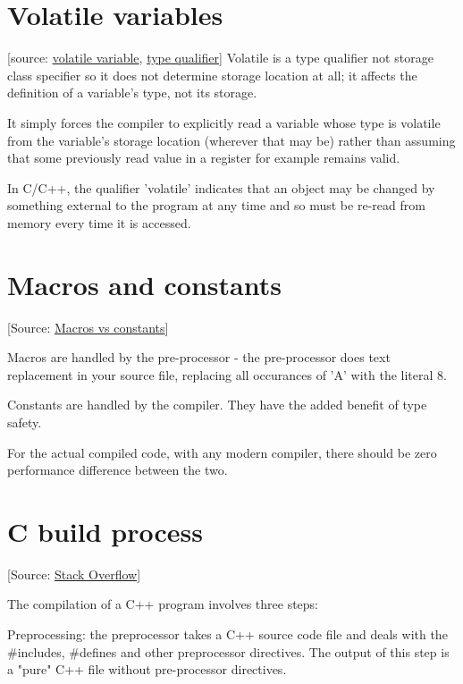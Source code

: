 \documentclass[11pt]{article}
\begin{document}
\section{Volatile variables}
\label{sec:org21c4f0e}
[source: \href{https://stackoverflow.com/questions/1665452/volatile-variable\#}{volatile variable}, \href{http://msdn.microsoft.com/en-us/library/888bfst6\%2528VS.80\%2529.aspx}{type qualifier}] 
Volatile is a type qualifier not storage class specifier so it does
not determine storage location at all; it affects the definition of a
variable's type, not its storage.

It simply forces the compiler to explicitly read a variable whose type
is volatile from the variable's storage location (wherever that may
be) rather than assuming that some previously read value in a register
for example remains valid.


In C/C++, the qualifier 'volatile' indicates that an object may be
changed by something external to the program at any time and so must
be re-read from memory every time it is accessed.

\section{Macros and constants}
\label{sec:orgc3a82c0}
[Source: \href{https://stackoverflow.com/questions/3216752/what-is-the-difference-between-macro-constants-and-constant-variables-in-c}{Macros vs constants}]

Macros are handled by the pre-processor - the pre-processor does text
replacement in your source file, replacing all occurances of 'A' with
the literal 8.


Constants are handled by the compiler. They have the added benefit of
type safety.


For the actual compiled code, with any modern compiler, there should
be zero performance difference between the two.




\section{C build process}
\label{sec:org2f5b588}
[Source: \href{https://stackoverflow.com/questions/6264249/how-does-the-compilation-linking-process-work}{Stack Overflow}]

The compilation of a C++ program involves three steps:

Preprocessing: the preprocessor takes a C++ source code file and
deals with the \#includes, \#defines and other preprocessor
directives. The output of this step is a "pure" C++ file without
pre-processor directives.
\end{document}
